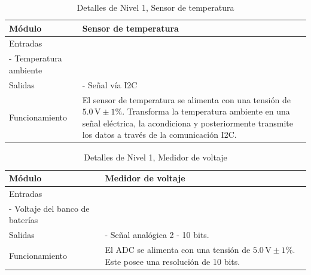 
\begin{table}[h!]
    \centering
    \caption{Detalles de Nivel 1, Sensor de temperatura}
    \label{tab:nivel2_Temperatura}
    \begin{tabular}{ll}
    \toprule
        Módulo  & Sensor de temperatura\\ 
    \midrule
        Entradas & 
        \begin{minipage}[t]{0.75\linewidth}
  - Alimentación $5.0 \, \text{V} \pm 1\%$\\
   - Temperatura ambiente
 
        \end{minipage} \\
    \midrule
        Salidas & 
        \begin{minipage}[t]{0.75\linewidth}
    - Señal vía I2C

        \end{minipage} \\
    \midrule
        Funcionamiento & 
        \begin{minipage}[t]{0.75\linewidth}
El sensor de temperatura se alimenta con una tensión de $5.0 \, \text{V} \pm 1\%$. Transforma la temperatura ambiente en una señal eléctrica, la acondiciona y posteriormente transmite los datos a través de la comunicación I2C.

        \end{minipage} \\
    \bottomrule
    \end{tabular}
\end{table}



\begin{table}[h!]
    \centering
    \caption{Detalles de Nivel 1, Medidor de voltaje}
    \label{tab:nivel2_Voltaje}
    \begin{tabular}{ll}
    \toprule
        Módulo  & Medidor de voltaje\\ 
    \midrule
        Entradas & 
        \begin{minipage}[t]{0.75\linewidth}
  - Alimentación $5.0 \, \text{V} \pm 1\%$\\
   - Voltaje del banco de baterías
 
        \end{minipage} \\
    \midrule
        Salidas & 
        \begin{minipage}[t]{0.75\linewidth}
    - Señal analógica 2 - 10 bits.

        \end{minipage} \\
    \midrule
        Funcionamiento & 
        \begin{minipage}[t]{0.75\linewidth}
El ADC se alimenta con una tensión de $5.0 \, \text{V} \pm 1\%$. Este posee una resolución de 10 bits. 

        \end{minipage} \\
    \bottomrule
    \end{tabular}
\end{table}

